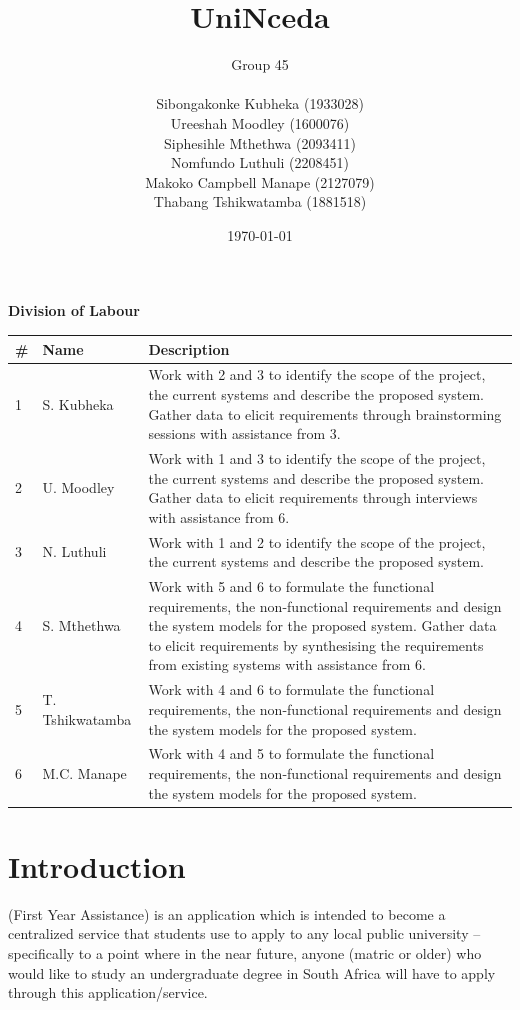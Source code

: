 \documentclass[a4paper, 12pt]{article}
\title{\textbf{UniNceda}}
\author{Group 45 \\ \\ Sibongakonke Kubheka (1933028)\\ Ureeshah Moodley (1600076) \\ Siphesihle Mthethwa (2093411) \\ Nomfundo Luthuli (2208451) \\ Makoko Campbell Manape (2127079) \\ Thabang Tshikwatamba (1881518)}
\date{\today}
\begin{document}
{\let\newpage\relax\maketitle}
\textbf{\large{Division of Labour}}
\newline
\newline

\begin{tabularx}{\textwidth}{llX}
\hline
\# & Name & Description \\
\hline
1 & S. Kubheka & Work with 2 and 3 to identify the scope of the project, the current systems and describe the proposed system. Gather data to elicit requirements through brainstorming sessions with assistance from 3.\\
2 & U. Moodley & Work with 1 and 3 to identify the scope of the project, the current systems and describe the proposed system. Gather data to elicit requirements through interviews with assistance from 6.\\
3 & N. Luthuli & Work with 1 and 2 to identify the scope of the project, the current systems and describe the proposed system.\\
4 & S. Mthethwa & Work with 5 and 6 to formulate the functional requirements, the non-functional requirements and design the system models for the proposed system. Gather data to elicit requirements by synthesising the requirements from existing systems with assistance from 6.\\
5 & T. Tshikwatamba & Work with 4 and 6 to formulate the functional requirements, the non-functional requirements and design the system models for the proposed system.\\
6 & M.C. Manape & Work with 4 and 5 to formulate the functional requirements, the non-functional requirements and design the system models for the proposed system.\\
\hline
\end{tabularx}

\newpage

\tableofcontents
{}
\newpage
{}

\section{Introduction}
(First Year Assistance) is an application which is intended to become a centralized service that students use to apply to any local public university – specifically to a point where in the near future, anyone (matric or older) who would like to study an undergraduate degree in South Africa will have to apply through this application/service. 
\end{document}
